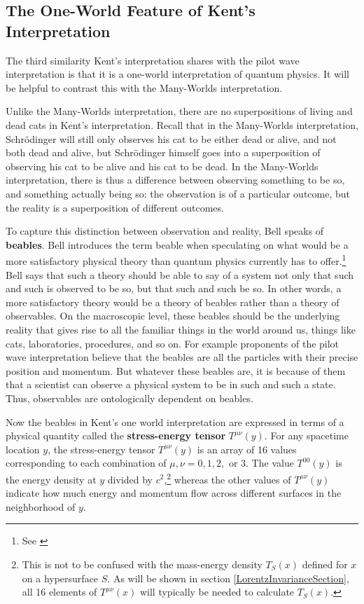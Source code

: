 \subsection{The One-World Feature of Kent's Interpretation}
The third similarity Kent's interpretation shares with the pilot wave interpretation is that it is a one-world interpretation of quantum physics. It will be helpful to contrast this with the Many-Worlds interpretation. 

Unlike the Many-Worlds interpretation, there are no superpositions of living and dead cats in Kent's interpretation. Recall that in the Many-Worlds interpretation, Schr\"{o}dinger will still only observes his cat to be either dead or alive, and not both dead and alive, but Schr\"{o}dinger himself goes into a superposition of observing his cat to be alive and his cat to be dead. In the Many-Worlds interpretation, there is thus a difference between observing something to be so, and something actually being so: the observation is of a particular outcome, but the reality is a superposition of different outcomes. 

To capture this distinction between observation and reality, Bell speaks of \textbf{beables}. Bell introduces the term beable when speculating on what would be a more satisfactory physical theory than quantum physics currently has to offer.\footnote{See \cite{Bell2}} Bell says that such a theory should be able to say of a system not only that such and such is observed to be so, but that such and such be so. In other words, a more satisfactory theory would be a theory of beables rather than a theory of observables. On the macroscopic level, these beables should be the underlying reality that gives rise to all the familiar things in the world around us, things like cats, laboratories, procedures, and so on. For example proponents of the pilot wave interpretation believe that the beables are all the particles with their precise position and momentum. But whatever these beables are, it is because of them that a scientist can observe a physical system to be in such and such a state. Thus, observables are ontologically dependent on beables.   

Now the beables in Kent's one world interpretation are expressed in terms of a physical quantity called the \textbf{stress-energy tensor}  $T^{\mu\nu}(y)$.\label{stressenergy}  For any spacetime location $y$, the stress-energy tensor $T^{\mu\nu}(y)$ is an array of 16 values corresponding to each combination of $\mu, \nu=0,1,2,$ or $3$. The value $T^{00}(y)$ is the energy density at $y$ divided by $c^2$,\footnote{This is not to be confused with the mass-energy density $T_S(x)$ defined for $x$ on a hypersurface $S$. As will be shown in section \ref{LorentzInvarianceSection},   all 16 elements of $T^{\mu\nu}(x)$ will typically be needed to calculate $T_S(x)$.} whereas the other values of $T^{\mu\nu}(y)$ indicate how much energy and momentum flow across different surfaces in the neighborhood of $y$. 

